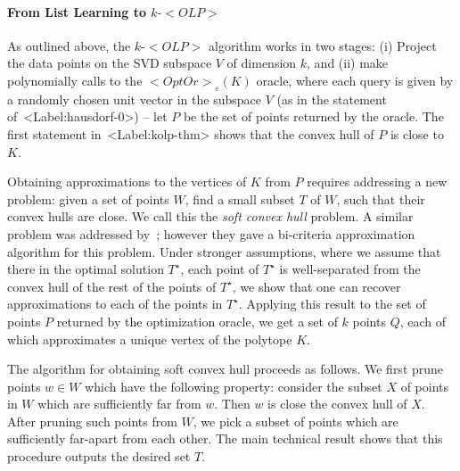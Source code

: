 \documentclass[11pt,letterpaper]{article}
\def\mathsf#1{<#1>}%
\def\xspace{}%
\def\Cref#1{<Label:#1>}%
\theoremstyle{definition}
\theoremstyle{remark}
\newcommand{\olp}{{\mathsf {OLP}}\xspace}
\newcommand{\kolp}{k\mbox{-}\olp}
\newcommand{\opto}{{\mathsf{OptOr}}}
\begin{document}
\paragraph{From List Learning to $\kolp$}
%
%
%
As outlined above, the $\kolp$ algorithm works in two stages: (i) Project the data points on the SVD subspace $V$ of dimension $k$, and (ii) make polynomially calls to the $\opto_\varepsilon(K)$ oracle, where each query is given by a randomly chosen unit vector in the subspace $V$ (as in the statement of~\Cref{hausdorf-0}) -- let $P$ be the set of points returned by the oracle. The first statement in~\Cref{kolp-thm} shows that the convex hull of $P$ is close to $K$.  



Obtaining approximations to the vertices of $K$ from $P$ requires addressing a new problem: given a set of points $W$, find a small subset $T$ of $W$, such that their convex hulls are close. We call this the {\em soft convex hull} problem. A similar problem was addressed by~\cite{BlumHR19}; however they gave a bi-criteria approximation algorithm for this problem. Under stronger assumptions, where we assume that there in the optimal solution $T^\star$, each point of $T^\star$ is well-separated from the convex hull of the rest of the points of $T^\star$, we show that one can recover approximations to each of the points in $T^\star$. Applying this result to the set of points $P$ returned by the optimization oracle, we get a set of $k$ points $Q$, each of which approximates a unique vertex of the polytope $K$. 

The algorithm for obtaining soft convex hull proceeds as follows. We first prune points $w \in W$ which have the following property: consider the subset $X$ of points in $W$ which are sufficiently far from $w$. Then $w$ is close the convex hull of $X$. After pruning such points from $W$, we pick a subset of points which are sufficiently far-apart from each other. The main technical result shows that this procedure outputs the desired set $T$.
\end{document}
